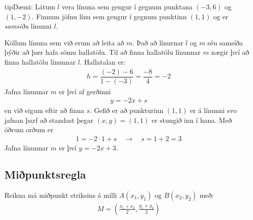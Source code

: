 \documentclass[a4paper,10pt,icelandic]{sphinxmanual}
\begin{document}
\begin{sphinxadmonition}{tip}{Dæmi:}
Látum \(l\) vera línuna sem gengur í gegnum punktana \((-3,6)\) og \((1,-2)\).
Finnum jöfnu línu sem gengur í gegnum punktinn \((1,1)\) og er \textit{samsíða} línunni \(l\).

Köllum línuna sem við erum að leita að \(m\). Það að línurnar \(l\) og \(m\) séu samsíða þýðir að þær hafa sömu hallatölu. Til að finna hallatölu línunnar \(m\) nægir því að finna hallatölu línunnar \(l\).
Hallatalan er:
\begin{equation*}
\begin{split}h=\dfrac{(-2)-6}{1-(-3)}=\dfrac{-8}{4}=-2\end{split}
\end{equation*}
Jafna línunnar \(m\) er því af gerðinni
\begin{equation*}
\begin{split}y=-2x+s\end{split}
\end{equation*}
en við eigum eftir að finna \(s\).
Gefið er að punkturinn \((1,1)\) er á línunni svo jafnan þarf að standast þegar \((x,y)=(1,1)\) er stungið inn í hana. Með öðrum orðum er
\begin{equation*}
\begin{split}1=-2\cdot 1+s \quad \rightarrow \quad s=1+2=3\end{split}
\end{equation*}
Jafna línunnar \(m\) er því \(y=-2x+3\).

\end{sphinxadmonition}


\subsection{Miðpunktsregla}
\label{\detokenize{Kafli03:mipunktsregla}}
Reikna má miðpunkt striksins á milli \(A(x_1, y_1)\) og \(B(x_2,y_2)\) með:
\begin{equation*}
\begin{split}M = \left( \frac{x_1+x_2}{2} , \frac{y_1+y_2}{2} \right)\end{split}
\end{equation*}
\end{document}
